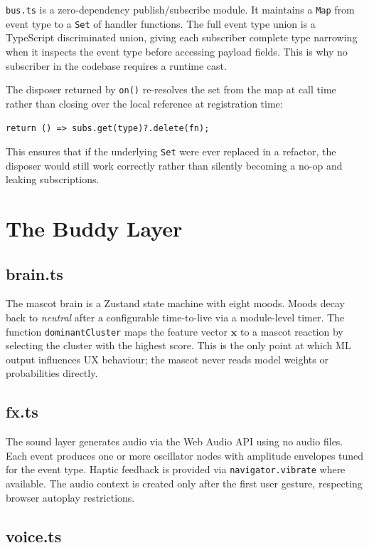 \documentclass[11pt, a4paper]{report}
\begin{document}
\texttt{bus.ts} is a zero-dependency publish/subscribe module. It maintains
a \texttt{Map} from event type to a \texttt{Set} of handler functions. The
full event type union is a TypeScript discriminated union, giving each
subscriber complete type narrowing when it inspects the event type before
accessing payload fields. This is why no subscriber in the codebase requires
a runtime cast.

The disposer returned by \texttt{on()} re-resolves the set from the map at
call time rather than closing over the local reference at registration time:

\smallskip
\centerline{\texttt{return () => subs.get(type)?.delete(fn);}}
\smallskip

This ensures that if the underlying \texttt{Set} were ever replaced in a
refactor, the disposer would still work correctly rather than silently
becoming a no-op and leaking subscriptions.

\section{The Buddy Layer}

\subsection{brain.ts}

The mascot brain is a Zustand state machine with eight moods. Moods decay
back to \textit{neutral} after a configurable time-to-live via a
module-level timer. The function \texttt{dominantCluster} maps the feature
vector $\mathbf{x}$ to a mascot reaction by selecting the cluster with the
highest score. This is the only point at which ML output influences UX
behaviour; the mascot never reads model weights or probabilities directly.

\subsection{fx.ts}

The sound layer generates audio via the Web Audio API using no audio files.
Each event produces one or more oscillator nodes with amplitude envelopes
tuned for the event type. Haptic feedback is provided via
\texttt{navigator.vibrate} where available. The audio context is created
only after the first user gesture, respecting browser autoplay restrictions.

\subsection{voice.ts}
\end{document}
